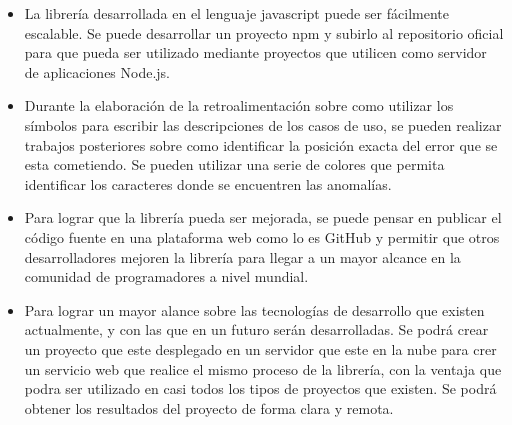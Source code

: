 \begin{itemize}
	\item La librería desarrollada en el lenguaje javascript puede ser fácilmente escalable. Se puede desarrollar un proyecto npm y subirlo al repositorio oficial para que pueda ser utilizado mediante proyectos que utilicen como servidor de aplicaciones Node.js. 
	\item Durante la elaboración de la retroalimentación sobre como utilizar los símbolos para escribir las descripciones de los casos de uso, se pueden realizar trabajos posteriores sobre como identificar la posición exacta del error que se esta cometiendo. Se pueden utilizar una serie de colores que permita identificar los caracteres donde se encuentren las anomalías.
	\item Para lograr que la librería pueda ser mejorada, se puede pensar en publicar el código fuente en una plataforma web como lo es GitHub y permitir que otros desarrolladores  mejoren la librería para llegar a un mayor alcance en la comunidad de programadores a nivel mundial.
	\item Para lograr un mayor alance sobre las tecnologías de desarrollo que existen actualmente, y con las que en un futuro serán desarrolladas. Se podrá crear un proyecto que este desplegado en un servidor que este en la nube para crer un servicio web que realice el mismo proceso de la librería, con la ventaja que podra ser utilizado en casi todos los tipos de proyectos que existen. Se podrá obtener los resultados del proyecto de forma clara y remota.  
\end{itemize}